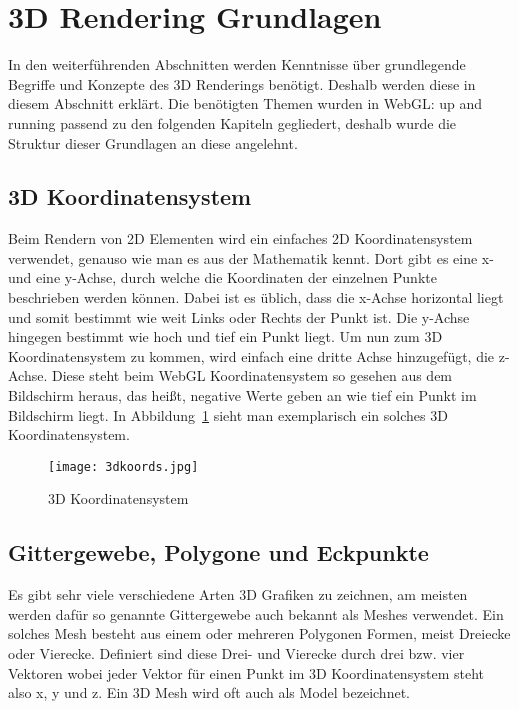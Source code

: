 \section{3D Rendering Grundlagen}
In den weiterführenden Abschnitten werden Kenntnisse über grundlegende Begriffe und Konzepte des 3D Renderings benötigt.
Deshalb werden diese in diesem Abschnitt erklärt.
Die benötigten Themen wurden in WebGL: up and running \cite[4-9]{parisi2012webgl} passend zu den folgenden Kapiteln gegliedert, deshalb wurde die Struktur dieser Grundlagen an diese angelehnt.

\subsection{3D Koordinatensystem}
Beim Rendern von 2D Elementen wird ein einfaches 2D Koordinatensystem verwendet, genauso wie man es aus der Mathematik kennt. Dort gibt es eine x- und eine y-Achse, durch welche die Koordinaten der einzelnen Punkte beschrieben werden können.
Dabei ist es üblich, dass die x-Achse horizontal liegt und somit bestimmt wie weit Links oder Rechts der Punkt ist. Die y-Achse hingegen bestimmt wie hoch und tief ein Punkt liegt.
Um nun zum 3D Koordinatensystem zu kommen, wird einfach eine dritte Achse hinzugefügt, die z-Achse. Diese steht beim WebGL Koordinatensystem so gesehen aus dem Bildschirm heraus, das heißt,
 negative Werte geben an wie tief ein Punkt im Bildschirm liegt. \cite[4]{parisi2012webgl} In Abbildung~\ref{fig:3DKoordinatensystem} sieht man exemplarisch ein solches 3D Koordinatensystem.
 \begin{figure}
    \centering
    \texttt{[image: 3dkoords.jpg]}
    \caption{3D Koordinatensystem \cite{PeterStrohm}} \label{fig:3DKoordinatensystem}
    \end{figure}

\subsection{Gittergewebe, Polygone und Eckpunkte}
Es gibt sehr viele verschiedene Arten 3D Grafiken zu zeichnen, am meisten werden dafür so genannte Gittergewebe auch bekannt als Meshes verwendet.
Ein solches Mesh besteht aus einem oder mehreren Polygonen Formen, meist Dreiecke oder Vierecke. Definiert sind diese Drei- und Vierecke durch drei bzw.
vier Vektoren wobei jeder Vektor für einen Punkt im 3D Koordinatensystem steht also x, y und z.
Ein 3D Mesh wird oft auch als Model bezeichnet. \cite[4]{parisi2012webgl}

